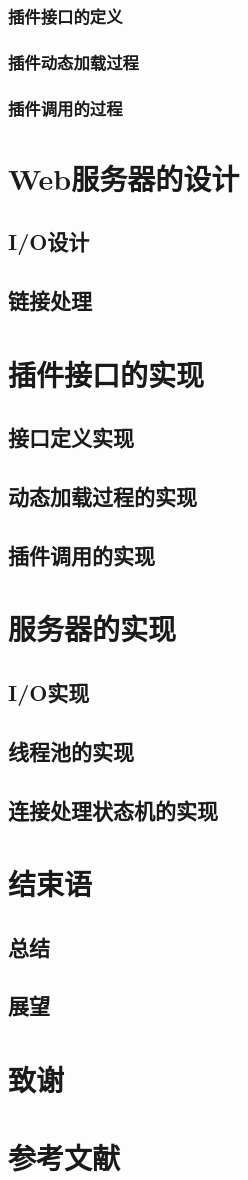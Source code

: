 \documentclass[18pt, twoside, a4paper, dvipdfm]{book}
\begin{document}
\subsection{插件接口的定义}
\subsection{插件动态加载过程}
\subsection{插件调用的过程}

\chapter{Web服务器的设计}
\section{I/O设计}
\section{链接处理}

\chapter{插件接口的实现}
\section{接口定义实现}
\section{动态加载过程的实现}
\section{插件调用的实现}

\chapter{服务器的实现}
\section{I/O实现}
\section{线程池的实现}
\section{连接处理状态机的实现}

\chapter{结束语}
\section{总结}
\section{展望}

\chapter*{致谢}
\chapter*{参考文献}
\end{document}
